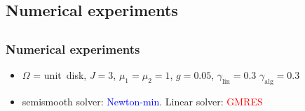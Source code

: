 \documentclass{beamer}
\begin{document}
\begin{frame}
\section{Numerical experiments}
\subsection{}

\frametitle{Numerical experiments}

\begin{itemize}
\item
$\Omega$ = \mbox{unit disk}, $J = 3$, $\mu_1= \mu_2 = 1$, $g = 0.05$, $\gamma_{\mathrm{lin}}=0.3$ $\gamma_{\mathrm{alg}}=0.3$
\item 
semismooth solver: \textcolor{blue}{Newton-min}. Linear solver: \textcolor{red}{GMRES}
\end{itemize}



\end{frame}
\end{document}
